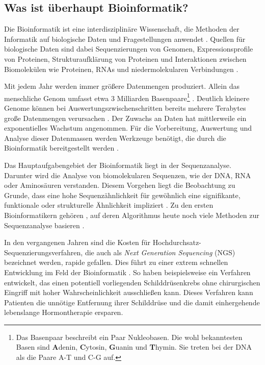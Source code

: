 \subsection[Bedeutung der Bioinformatik]{Was ist überhaupt Bioinformatik?}

Die Bioinformatik ist eine interdisziplinäre Wissenschaft, die Methoden der Informatik auf biologische Daten und Fragestellungen anwendet \citep{Gibas:2002wk}. Quellen für biologische Daten sind dabei Sequenzierungen von Genomen, Expressionsprofile von Proteinen, Strukturaufklärung von Proteinen und Interaktionen zwischen Biomolekülen wie Proteinen, RNAs und niedermolekularen Verbindungen \citep{Rarey:E0TiqhGO}.

Mit jedem Jahr werden immer größere Datenmengen produziert. Allein das menschliche Genom umfasst etwa 3 Milliarden Basenpaare\footnote{Das Basenpaar beschreibt ein Paar Nukleobasen. Die wohl bekanntesten Basen sind \textbf{A}denin, \textbf{C}ytosin, \textbf{G}uanin und \textbf{T}hymin. Sie treten bei der DNA als die Paare A-T und C-G auf.} \citep{Tisdall:2001td}. Deutlich kleinere Genome können bei Auswertungszwischenschritten bereits mehrere Terabytes große Datenmengen verursachen \citep{Reinert:tg}. Der Zuwachs an Daten hat mittlerweile ein exponentielles Wachstum angenommen. Für die Vorbereitung, Auswertung und Analyse dieser Datenmassen werden Werkzeuge benötigt, die durch die Bioinformatik bereitgestellt werden \citep{Gibas:2002wk}.

Das Hauptaufgabengebiet der Bioinformatik liegt in der Sequenzanalyse. Darunter wird die Analyse von biomolekularen Sequenzen, wie der DNA, RNA oder Aminosäuren verstanden. Diesem Vorgehen liegt die Beobachtung zu Grunde, dass eine hohe Sequenzähnlichkeit für gewöhnlich eine signifikante, funktionale oder strukturelle Ähnlichkeit impliziert \citep{AlgorithmenundDate:2011wx}. Zu den ersten Bioinformatikern gehören \cite{Needleman:1970vq}, auf deren Algorithmus heute noch viele Methoden zur Sequenzanalyse basieren \citep{hansen2013bioinformatik}.

In den vergangenen Jahren sind die Kosten für Hochdurchsatz-Sequenzierungsverfahren, die auch als \textit{Next Generation Sequencing} (NGS) bezeichnet werden, rapide gefallen. Dies führt zu einer extrem schnellen Entwicklung im Feld der Bioinformatik \citep{Li:2012fl}. So haben beispielsweise \cite{Alexander:2012fb} ein Verfahren entwickelt, das einen potentiell vorliegenden Schilddrüsenkrebs ohne chirurgischen Eingriff mit hoher Wahrscheinlichkeit ausschließen kann. Dieses Verfahren kann Patienten die unnötige Entfernung ihrer Schilddrüse und die damit einhergehende lebenslange Hormontherapie ersparen.

